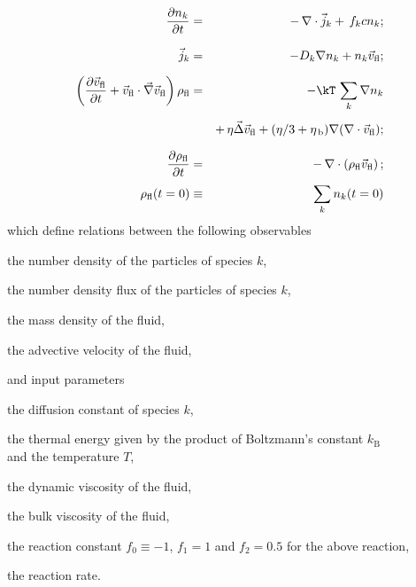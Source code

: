 \begin{eqnarray}
\label{eq:ek-reaction-continuity} \frac{\partial n_k}{\partial t} & = & -\, \nabla \cdot \vec{j}_k +\, f_{k} c n_{k} \vphantom{\left(\frac{\partial}{\partial}\right)} ; \\
\label{eq:ek-reaction-fluxes} \vec{j}_{k} & = & -D_k \nabla n_k + n_k \vec{v}_{\mathrm{fl}} \vphantom{\left(\frac{\partial}{\partial}\right)} ; \\
\nonumber \left(\frac{\partial \vec{v}_{\mathrm{fl}}}{\partial t} + \vec{v}_{\mathrm{fl}} \cdot \vec{\nabla} \vec{v}_{\mathrm{fl}} \right) \rho_\mathrm{fl} & = & -\kT \, \sum_{k} \nabla n_k   \\
\label{eq:ek-reaction-velocity} & & +\, \eta \vec{\Delta} \vec{v}_{\mathrm{fl}} + (\eta / 3 + \eta_{\text{\,b}}) \nabla (\nabla \cdot \vec{v}_{\mathrm{fl}}) \vphantom{\left(\frac{\partial}{\partial}\right)} ; \\
\label{eq:ek-reaction-continuity-fl} \frac{\partial \rho_\mathrm{fl}}{\partial t} & = & -\,\nabla\cdot\left( \rho_\mathrm{fl} \vec{v}_{\mathrm{fl}} \right) \vphantom{\left(\frac{\partial}{\partial}\right)} ; \\
\label{eq:ek-reaction-init} \rho_{\mathrm{fl}}(t = 0) & \equiv & \sum_{k} n_{k} (t = 0)
\end{eqnarray}
which define relations between the following observables
\begin{description}[itemsep=0cm,labelindent=1.5em,leftmargin=4.5em,style=nextline]
  \item[$n_k$] the number density of the particles of species $k$,
  \item[$\vec{j}_k$] the number density flux of the particles of species $k$,
  \item[$\rho_{\mathrm{fl}}$] the mass density of the fluid,
  \item[$\vec{v}_{\mathrm{fl}}$] the advective velocity of the fluid,
\end{description}
and input parameters
\begin{description}[itemsep=0cm,labelindent=1.5em,leftmargin=4.5em,style=nextline]
  \item[$D_k$] the diffusion constant of species $k$,
  \item[$\kT$] the thermal energy given by the product of Boltzmann's constant
  $k_\text{B}$\\and the temperature $T$,
  \item[$\eta$] the dynamic viscosity of the fluid,
  \item[$\eta_{\text{\,b}}$] the bulk viscosity of the fluid,
  \item[$f_{k}$] the reaction constant $f_{0} \equiv -1$, $f_{1} = 1$ and $f_{2} = 0.5$ for the above reaction,
  \item[$c$] the reaction rate.
\end{description}
